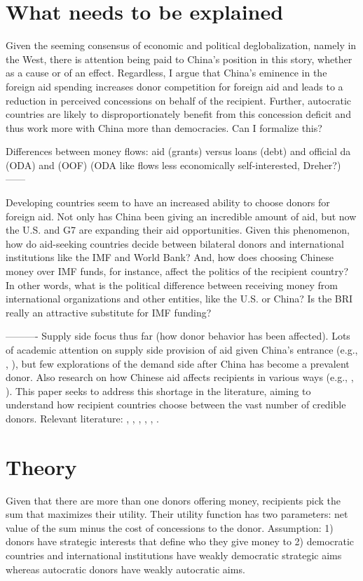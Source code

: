 \section*{What needs to be explained}
Given the seeming consensus of economic and political deglobalization,  namely in the West, there is attention being paid to China's position in this story, whether as a cause or of an effect. Regardless, I argue that China's eminence in the foreign aid spending increases donor competition for foreign aid and leads to a reduction in perceived concessions on behalf of the recipient. Further, autocratic countries are likely to disproportionately benefit from this concession deficit and thus work more with China more than democracies. Can I formalize this?

Differences between money flows: aid (grants) versus loans (debt) and official da (ODA) and (OOF) (ODA like flows less economically self-interested, Dreher?)
------

Developing countries seem to have an increased ability to choose donors for foreign aid. Not only has China been giving an incredible amount of aid, but now the U.S. and G7 are expanding their aid opportunities. Given this phenomenon, how do aid-seeking countries decide between bilateral donors and international institutions like the IMF and World Bank? And, how does choosing Chinese money over IMF funds, for instance, affect the politics of the recipient country? In other words, what is the political difference between receiving money from international organizations and other entities, like the U.S. or China? Is the BRI really an attractive substitute for IMF funding?

----------
Supply side focus thus far (how donor behavior has been affected).
Lots of academic attention on supply side provision of aid given China's entrance (e.g., \cite{dreher2018}, \cite{dreher2015}), but few explorations of the demand side after China has become a prevalent donor. Also research on how Chinese aid affects recipients in various ways (e.g., \cite{martorano2020}, \cite{bader2015}).
This paper seeks to address this shortage in the literature, aiming to understand how recipient countries choose between the vast number of credible donors. Relevant literature: \cite{kilama2016a}, \cite{hernandez2017}, \cite{li2017a}, \cite{isaksson2018}, \cite{humphrey2019}, \cite{broich2017a}.

\section*{Theory} 
Given that there are more than one donors offering money, recipients pick the sum that maximizes their utility. Their utility function has two parameters: net value of the sum minus the cost of concessions to the donor. Assumption: 1) donors have strategic interests that define who they give money to 2) democratic countries and international institutions have weakly democratic strategic aims whereas autocratic donors have weakly autocratic aims. 

